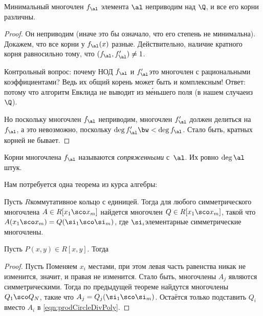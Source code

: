 \documentclass[a4paper]{article}
\begin{document}
\begin{stm}
Минимальный многочлен $f_\al$ элемента $\al$ неприводим над $\Q$, и все его корни различны.
\end{stm}
\begin{proof}
Он неприводим (иначе это бы означало, что его степень не минимальна).
Докажем, что все корни у $f_{\al}(x)$ разные. Действительно, наличие кратного корня
равносильно тому, что $(f_\al, f_\al') \neq 1$.
\begin{petit}
Контрольный вопрос: почему НОД $f_\al$ и $f_\al'$\т это многочлен с рациональными коэффициентами?
Ведь их общий корень может быть и комплексным! Ответ: потому что алгоритм Евклида не выводит из м\'еньшего
поля (в нашем случае\т из $\Q$).
\end{petit}
Но поскольку многочлен $f_\al$ неприводим, многочлен $f_\al'$ должен
делиться на $f_\al$, а это невозможно, поскольку $\deg f'_\al\bw<\deg f_\al$. Стало быть, кратных корней не бывает.
\end{proof}

\begin{df}
Корни многочлена $f_{\al}$ называются \emph{сопряженными} с~$\al$. Их ровно $\deg\al$ штук.
\end{df}

Нам потребуется одна теорема из курса алгебры:

\begin{theorem}\label{thm:symPoly}
Пусть $R$\т  коммутативное кольцо с единицей. Тогда для любого симметрического многочлена $A\in
R[x_1\sco x_m]$ найдется многочлен $Q\in R[x_1\sco x_m]$, такой что $A(x_1\sco x_m)=Q(\si_1\sco \si_m)$, где
$\si_i$\т элементарные симметрические многочлены.
\end{theorem}

\begin{lemma}\label{lem:rationalPoly}
Пусть $P(x,y)\in R[x,y]$. Тогда
\end{lemma}
\begin{proof}
Пусть
Поменяем $x_i$ местами, при этом левая часть равенства никак не изменится, значит, и правая не изменится.
Стало быть, многочлены $A_j$ являются симметрическими.
Тогда по предыдущей теореме найдутся многочлены $Q_1\sco Q_N$, такие что $A_j=Q_j(\si_1\sco \si_m)$.
Остаётся только подставить $Q_i$ вместо $A_i$ в \eqref{eqn:prodCircleDivPoly}.
\end{proof}
\end{document}
